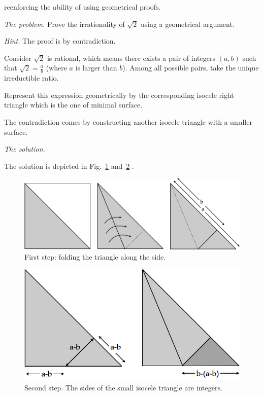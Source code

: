 reenforcing the ability of using geometrical proofs.
\medskip

\noindent \textit{The problem.}
Prove the irrationality of $\sqrt{2}$ using a geometrical argument.
\medskip

\noindent \textit{Hint.}
The proof is by contradiction. 

Consider $\sqrt{2}$ is rational, which means there exists a pair of integers $(a,b)$
such that $\sqrt{2} = \frac{a}{b}$ (where $a$ is larger than $b$).
Among all possible pairs, take the unique irreductible ratio.

Represent this expression geometrically by the corresponding isocele right triangle
which is the one of minimal surface. 

The contradiction comes by constructing another isocele triangle with a smaller surface.
\medskip

\noindent \textit{The solution.}

The solution is depicted in Fig.~\ref{Fig:sqrtbisInit} and~\ref{Fig:sqrtbisFin} . 
\begin{figure}
\begin{center}
        \includegraphics[scale=0.3]{FiguresArithmetic/sqrtbisInit}
        \caption{First step: folding the triangle along the side.}
        \label{Fig:sqrtbisInit}
\end{center}
\end{figure}
\begin{figure}
\begin{center}
        \includegraphics[scale=0.3]{FiguresArithmetic/sqrtbisFin}
        \caption{Second step. The sides of the small isocele triangle are integers.}
        \label{Fig:sqrtbisFin}
\end{center}
\end{figure}



